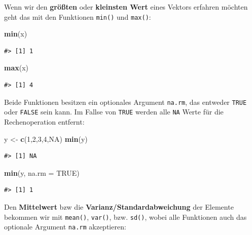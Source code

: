 \documentclass[]{book}
\newenvironment{Shaded}{\begin{snugshade}}{\end{snugshade}}
\newcommand{\KeywordTok}[1]{\textcolor[rgb]{0.13,0.29,0.53}{\textbf{#1}}}
\newcommand{\DataTypeTok}[1]{\textcolor[rgb]{0.13,0.29,0.53}{#1}}
\newcommand{\DecValTok}[1]{\textcolor[rgb]{0.00,0.00,0.81}{#1}}
\newcommand{\StringTok}[1]{\textcolor[rgb]{0.31,0.60,0.02}{#1}}
\newcommand{\OtherTok}[1]{\textcolor[rgb]{0.56,0.35,0.01}{#1}}
\newcommand{\NormalTok}[1]{#1}
\begin{document}
Wenn wir den \textbf{größten} oder \textbf{kleinsten Wert} eines Vektors
erfahren möchten geht das mit den Funktionen \texttt{min()} und
\texttt{max()}:

\begin{Shaded}
\begin{Highlighting}[]
\KeywordTok{min}\NormalTok{(x)}
\end{Highlighting}
\end{Shaded}

\begin{verbatim}
#> [1] 1
\end{verbatim}

\begin{Shaded}
\begin{Highlighting}[]
\KeywordTok{max}\NormalTok{(x)}
\end{Highlighting}
\end{Shaded}

\begin{verbatim}
#> [1] 4
\end{verbatim}

Beide Funktionen besitzen ein optionales Argument \texttt{na.rm}, das
entweder \texttt{TRUE} oder \texttt{FALSE} sein kann. Im Fallse von
\texttt{TRUE} werden alle \texttt{NA} Werte für die Rechenoperation
entfernt:

\begin{Shaded}
\begin{Highlighting}[]
\NormalTok{y <-}\StringTok{ }\KeywordTok{c}\NormalTok{(}\DecValTok{1}\NormalTok{,}\DecValTok{2}\NormalTok{,}\DecValTok{3}\NormalTok{,}\DecValTok{4}\NormalTok{,}\OtherTok{NA}\NormalTok{)}
\KeywordTok{min}\NormalTok{(y)}
\end{Highlighting}
\end{Shaded}

\begin{verbatim}
#> [1] NA
\end{verbatim}

\begin{Shaded}
\begin{Highlighting}[]
\KeywordTok{min}\NormalTok{(y, }\DataTypeTok{na.rm =} \OtherTok{TRUE}\NormalTok{)}
\end{Highlighting}
\end{Shaded}

\begin{verbatim}
#> [1] 1
\end{verbatim}

Den \textbf{Mittelwert} bzw die \textbf{Varianz/Standardabweichung} der
Elemente bekommen wir mit \texttt{mean()}, \texttt{var()}, bzw.
\texttt{sd()}, wobei alle Funktionen auch das optionale Argument
\texttt{na.rm} akzeptieren:
\end{document}
